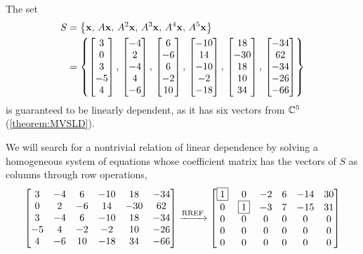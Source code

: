 \documentclass{ximera}
\begin{document}
\begin{example}
The set
\begin{align*}
S&=\left\{\mathbf{x},\,A\mathbf{x},\,A^2\mathbf{x},\,A^3\mathbf{x},\,A^4\mathbf{x},\,A^5\mathbf{x}\right\}\\
&=
\left\{
\begin{bmatrix}3\\0\\3\\-5\\4\end{bmatrix},\,
\begin{bmatrix}-4\\2\\-4\\4\\-6\end{bmatrix},\,
\begin{bmatrix}6\\-6\\6\\-2\\10\end{bmatrix},\,
\begin{bmatrix}-10\\14\\-10\\-2\\-18\end{bmatrix},\,
\begin{bmatrix}18\\-30\\18\\10\\34\end{bmatrix},\,
\begin{bmatrix}-34\\62\\-34\\-26\\-66\end{bmatrix}
\right\}
\end{align*}
is guaranteed to be linearly dependent, as it has six vectors from $\mathbb{C}^{5}$ (\ref{theorem:MVSLD}).

We will search for a nontrivial relation of linear dependence by
solving a homogeneous system of equations whose coefficient matrix has
the vectors of $S$ as columns through row operations,
\[
\begin{bmatrix}
3 & -4 & 6 & -10 & 18 & -34\\
0 & 2 & -6 & 14 & -30 & 62\\
3 & -4 & 6 & -10 & 18 & -34\\
-5 & 4 & -2 & -2 & 10 & -26\\
4 & -6 & 10 & -18 & 34 & -66
\end{bmatrix}
\xrightarrow{\text{RREF}}
\begin{bmatrix}
\fbox{1} & 0 & -2 & 6 & -14 & 30\\
0 & \fbox{1} & -3 & 7 & -15 & 31\\
0 & 0 & 0 & 0 & 0 & 0\\
0 & 0 & 0 & 0 & 0 & 0\\
0 & 0 & 0 & 0 & 0 & 0
\end{bmatrix}
\]


\end{example}
\end{document}
